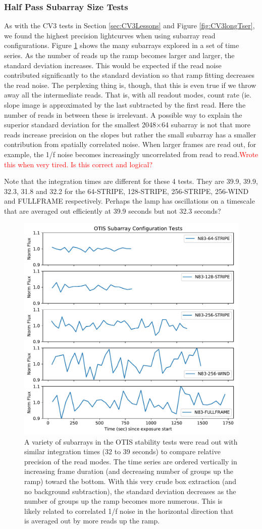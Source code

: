 \documentclass{aastex62}
\begin{document}
\clearpage

\subsubsection{Half Pass Subarray Size Tests}

As with the CV3 tests in Section \ref{sec:CV3Lessons} and Figure \ref{fig:CV3longTser}, we found the highest precision lightcurves when using subarray read configurations.
Figure \ref{fig:OTISsubarrays} shows the many subarrays explored in a set of time series.
As the number of reads up the ramp becomes larger and larger, the standard deviation increases.
This would be expected if the read noise contributed significantly to the standard deviation so that ramp fitting decreases the read noise.
The perplexing thing is, though, that this is even true if we throw away all the intermediate reads.
That is, with all readout modes, count rate (ie. slope image is approximated by the last subtracted by the first read.
Here the number of reads in between these is irrelevant.
A possible way to explain the superior standard deviation for the smallest 2048$\times$64 subarray is not that more reads increase precision on the slopes but rather the small subarray has a smaller contribution from spatially correlated noise.
When larger frames are read out, for example, the 1/f noise becomes increasingly uncorrelated from read to read.\textcolor{red}{Wrote this when very tired. Is this correct and logical?}

Note that the integration times are different for these 4 tests. They are 39.9, 39.9, 32.3, 31.8 and 32.2 for the 64-STRIPE, 128-STRIPE, 256-STRIPE, 256-WIND and FULLFRAME respectively. Perhaps the lamp has oscillations on a timescale that are averaged out efficiently at 39.9 seconds but not 32.3 seconds?

\begin{figure}[!hbtp]
\centering
\includegraphics[width=.5\columnwidth]{subarray_config_tser.pdf}
\caption{A variety of subarrays in the OTIS stability tests were read out with similar integration times (32 to 39 seconds) to compare relative precision of the read modes. 
The time series are ordered vertically in increasing frame duration (and decreasing number of groups up the ramp) toward the bottom.
With this very crude box extraction (and no background subtraction), the standard deviation decreases as the number of groups up the ramp becomes more numerous.
This is likely related to correlated 1/f noise in the horizontal direction that is averaged out by more reads up the ramp.}\label{fig:OTISsubarrays}
\end{figure}
\end{document}

